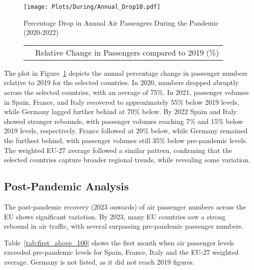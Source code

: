 \documentclass[12pt,onehalfspacing,headsepline,oneside,openright,a4paper, fleqn]{report}
\begin{document}
\begin{figure}[H]
    \centering
    \caption{Percentage Drop in Annual Air Passengers During the Pandemic (2020-2022)}
    \label{fig:tourist_passenger_drop}
	\texttt{[image: Plots/During/Annual\_Drop10.pdf]}
\end{figure}


\begin{figure}[H]
\centering
\begin{tabular}{c l}
\fbox{\textcolor{blueColor}{\rule{1em}{1em}}} & Relative Change in Passengers compared to 2019 (\%) \\[5pt]
\end{tabular}
\end{figure}

The plot in Figure~\ref{fig:tourist_passenger_drop} depicts the annual percentage change in passenger numbers relative to 2019 for the selected countries. In 2020, numbers dropped abruptly across the selected countries, with an average of 75\%. In 2021, passenger volumes in Spain, France, and Italy recovered to approximately 55\% below 2019 levels, while Germany lagged further behind at 70\% below. By 2022 Spain and Italy showed stronger rebounds, with passenger volumes reaching 7\% and 15\% below 2019 levels, respectively. France followed at 20\% below, while Germany remained the furthest behind, with passenger volumes still 35\% below pre-pandemic levels. The weighted EU-27 average followed a similar pattern, confirming that the selected countries capture broader regional trends, while revealing some variation.

\newpage


\subsection{Post-Pandemic Analysis}
\label{sec:post_pandemic}

The post-pandemic recovery (2023 onwards) of air passenger numbers across the EU shows significant variation. By 2023, many EU countries saw a strong rebound in air traffic, with several surpassing pre-pandemic passenger numbers. 

Table~\ref{tab:first_above_100} shows the first month when air passenger levels exceeded pre-pandemic levels for Spain, France, Italy and the EU-27 weighted average. Germany is not listed, as it did not reach 2019 figures. 
\end{document}
